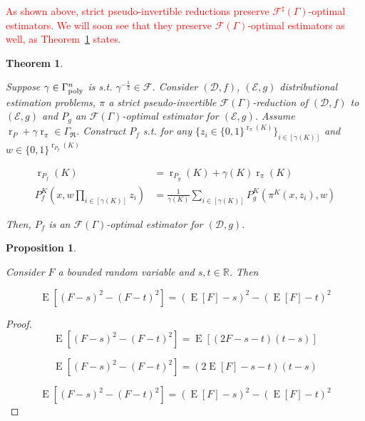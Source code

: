 \documentclass[11pt]{article}
\numberwithin{equation}{section}
\theoremstyle{definition}
\theoremstyle{plain}
\newtheorem{theorem}{Theorem}[section]
\newtheorem{proposition}{Proposition}[section]
\newcommand{\Bool}{\{0,1\}}
\DeclareMathOperator{\E}{E}
\DeclareMathOperator{\R}{r}
\newcommand{\Reals}{\mathbb{R}}
\newcommand{\Dist}{\mathcal{D}}
\newcommand{\GrowR}{\Gamma_{\mathfrak{R}}}
\newcommand{\Fall}{\mathcal{F}}
\newcommand{\EG}{\Fall(\Gamma)}
\newcommand{\ESG}{\Fall^\sharp(\Gamma)}
\newcommand{\BoolR}[1]{\Bool^{\R_{#1}(K)}}
\newcommand{\GammaPoly}{\Gamma_{\textnormal{poly}}}
\begin{document}
\begin{samepage}
\textcolor{red}{As shown above, strict pseudo-invertible reductions preserve $\ESG$-optimal estimators. We will soon see that they preserve $\EG$-optimal estimators as well, as Theorem~\ref{thm:sp_reduce} states.}
\begin{theorem}
\label{thm:sp_reduce}

Suppose $\gamma \in \GammaPoly^n$ is s.t. $\gamma^{-\frac{1}{2}} \in \Fall$. Consider $(\Dist,f)$, $(\mathcal{E},g)$ distributional estimation problems, $\pi$ a strict pseudo-invertible $\EG$-reduction of $(\Dist, f)$ to $(\mathcal{E}, g)$ and $P_g$ an $\EG$-optimal estimator for $(\mathcal{E}, g)$. Assume $\R_P + \gamma \R_\pi \in \GrowR$. Construct ${P_f}$  s.t. for any ${\{z_i \in \BoolR{\pi}\}_{i \in [\gamma(K)]}}$ and ${w \in \BoolR{P_g}}$

\begin{align}
\label{eqn:thm__sp_reduce__rpf}\R_{P_f}(K) &= \R_{P_g}(K) + \gamma(K) \R_\pi(K) \\
\label{eqn:thm__sp_reduce__pf}P_f^K\left(x, w \prod_{i \in [\gamma(K)]} z_i\right) &= \frac{1}{\gamma(K)}\sum_{i \in [\gamma(K)]} P_g^K(\pi^K(x,z_i),w)
\end{align}


Then, $P_f$ is an $\EG$-optimal estimator for ${(\Dist,g)}$.

\end{theorem}
\end{samepage}

\begin{samepage}
\begin{proposition}
\label{prp:ev_diff_sq}

Consider ${F}$ a bounded random variable and ${s,t \in \Reals}$. Then

\begin{equation}
\E[(F - s)^2 - (F - t)^2] = (\E[F] - s)^2 - (\E[F] - t)^2
\end{equation}

\end{proposition}
\end{samepage}

\begin{proof}

\[\E[(F - s)^2 - (F - t)^2] = \E[(2F - s - t)(t-s)]\]

\[\E[(F - s)^2 - (F - t)^2] = (2\E[F] - s - t)(t-s)\]

\[\E[(F - s)^2 - (F - t)^2] = (\E[F] - s)^2 - (\E[F] - t)^2\]
%
\end{proof}
\end{document}
